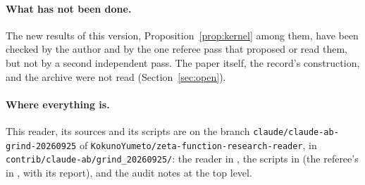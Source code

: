 \paragraph{What has not been done.}
The new results of this version, Proposition~\ref{prop:kernel} among them, have been checked by the author and by the one referee pass that proposed or read them, but not by a second independent pass. The paper \cite{CDP20} itself, the record's construction, and the archive  were not read (Section~\ref{sec:open}).

\paragraph{Where everything is.}
This reader, its sources and its scripts are on the branch \texttt{claude/claude-ab-grind-20260925} of \texttt{KokunoYumeto/zeta-function-research-reader}, in \texttt{contrib/claude-ab/grind\_20260925/}: the reader in , the scripts in  (the referee's in , with its report), and the audit notes at the top level.
